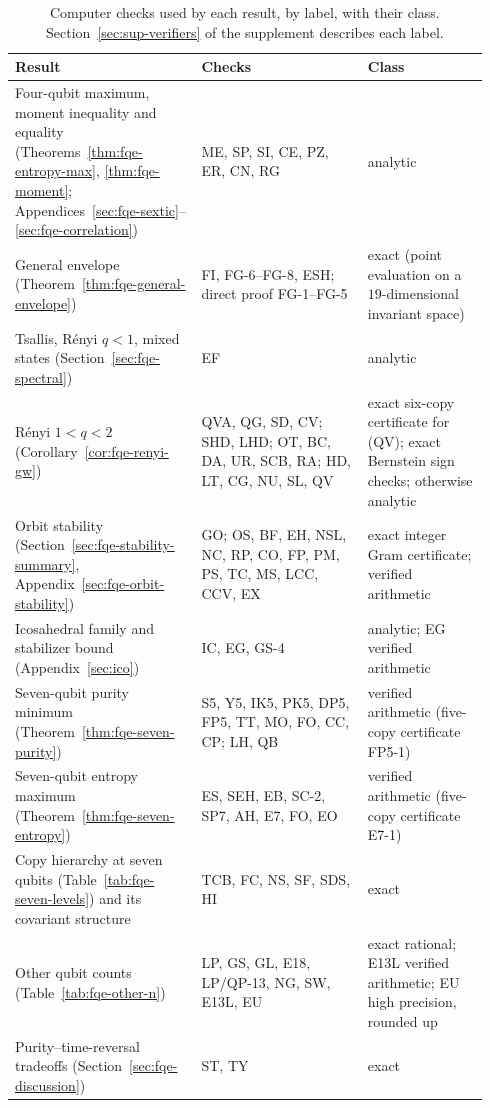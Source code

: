 \begin{table}[ht]
\centering\small
\renewcommand{\arraystretch}{1.15}
\begin{tabular}{@{}>{\raggedright\arraybackslash}p{0.37\linewidth}>{\raggedright\arraybackslash}p{0.33\linewidth}>{\raggedright\arraybackslash}p{0.24\linewidth}@{}}
\toprule
Result & Checks & Class\\
\midrule
Four-qubit maximum, moment inequality and equality (Theorems~\ref{thm:fqe-entropy-max}, \ref{thm:fqe-moment};
Appendices~\ref{sec:fqe-sextic}--\ref{sec:fqe-correlation}) & ME, SP, SI, CE, PZ, ER, CN, RG & analytic\\
General envelope (Theorem~\ref{thm:fqe-general-envelope}) & FI, FG-6--FG-8, ESH; direct proof FG-1--FG-5 &
exact (point evaluation on a $19$-dimensional invariant space)\\
Tsallis, R\'enyi $q<1$, mixed states (Section~\ref{sec:fqe-spectral}) & EF & analytic\\
R\'enyi $1<q<2$ (Corollary~\ref{cor:fqe-renyi-gw}) & QVA, QG, SD, CV; SHD, LHD; OT, BC, DA, UR, SCB, RA; HD, LT,
CG, NU, SL, QV & exact six-copy certificate for (QV); exact Bernstein sign checks; otherwise analytic\\
Orbit stability (Section~\ref{sec:fqe-stability-summary}, Appendix~\ref{sec:fqe-orbit-stability}) & GO; OS, BF, EH,
NSL, NC, RP, CO, FP, PM, PS, TC, MS, LCC, CCV, EX & exact integer Gram certificate; verified arithmetic\\
Icosahedral family and stabilizer bound (Appendix~\ref{sec:ico}) & IC, EG, GS-4 & analytic; EG verified arithmetic\\
Seven-qubit purity minimum (Theorem~\ref{thm:fqe-seven-purity}) & S5, Y5, IK5, PK5, DP5, FP5, TT, MO, FO, CC, CP; LH, QB &
verified arithmetic (five-copy certificate FP5-1)\\
Seven-qubit entropy maximum (Theorem~\ref{thm:fqe-seven-entropy}) & ES, SEH, EB, SC-2, SP7, AH, E7, FO, EO &
verified arithmetic (five-copy certificate E7-1)\\
Copy hierarchy at seven qubits (Table~\ref{tab:fqe-seven-levels}) and its covariant structure & TCB, FC, NS, SF, SDS, HI & exact\\
Other qubit counts (Table~\ref{tab:fqe-other-n}) & LP, GS, GL, E18, LP/QP-13, NG, SW, E13L, EU & exact rational;
E13L verified arithmetic; EU high precision, rounded up\\
Purity--time-reversal tradeoffs (Section~\ref{sec:fqe-discussion}) & ST, TY & exact\\
\bottomrule
\end{tabular}
\caption{Computer checks used by each result, by label, with their class. Section~\ref{sec:sup-verifiers} of the
supplement describes each label.}
\label{tab:fqe-checks}
\end{table}
